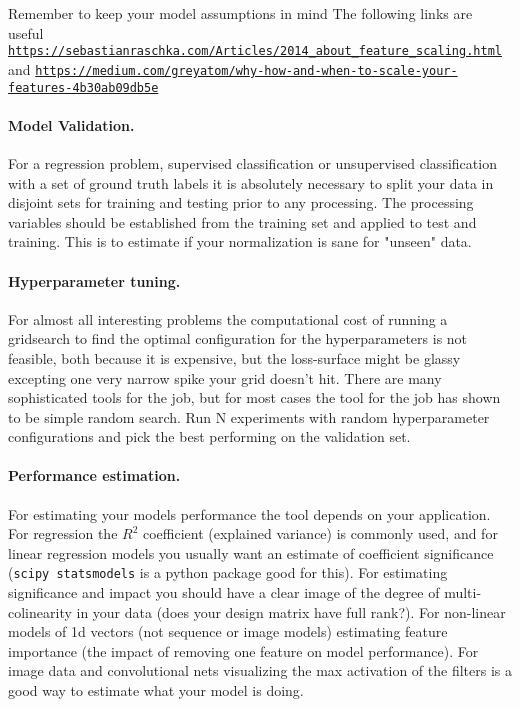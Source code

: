 \documentclass[%
oneside,                 %
final,                   %
10pt]{article}
\begin{document}
Remember to keep your model assumptions in mind
The following links are useful \href{{https://sebastianraschka.com/Articles/2014_about_feature_scaling.html}}{\nolinkurl{https://sebastianraschka.com/Articles/2014_about_feature_scaling.html}} and  \href{{https://medium.com/greyatom/why-how-and-when-to-scale-your-features-4b30ab09db5e}}{\nolinkurl{https://medium.com/greyatom/why-how-and-when-to-scale-your-features-4b30ab09db5e}}


\paragraph{Model Validation.}
For a regression problem, supervised classification or unsupervised
classification with a set of ground truth labels it is absolutely
necessary to split your data in disjoint sets for training and testing
prior to any processing. The processing variables should be
established from the training set and applied to test and
training. This is to estimate if your normalization is sane for
"unseen" data.

\paragraph{Hyperparameter tuning.}
For almost all interesting problems the computational cost of running
a gridsearch to find the optimal configuration for the hyperparameters
is not feasible, both because it is expensive, but the loss-surface
might be glassy excepting one very narrow spike your grid doesn't
hit. There are many sophisticated tools for the job, but for most
cases the tool for the job has shown to be simple random search. Run N
experiments with random hyperparameter configurations and pick the
best performing on the validation set.


\paragraph{Performance estimation.}
For estimating your models performance the tool depends on your
application. For regression the $R^2$ coefficient (explained variance)
is commonly used, and for linear regression models you usually want an
estimate of coefficient significance (\texttt{scipy statsmodels} is a python
package good for this). For estimating significance and impact you
should have a clear image of the degree of multi-colinearity in your
data (does your design matrix have full rank?). For non-linear models
of 1d vectors (not sequence or image models) estimating feature
importance (the impact of removing one feature on model
performance). For image data and convolutional nets visualizing the
max activation of the filters is a good way to estimate what your
model is doing.
\end{document}
